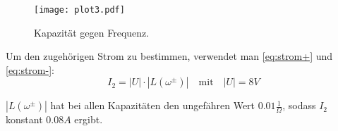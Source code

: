 \begin{figure}
  \centering
  \texttt{[image: plot3.pdf]}
  \caption{Kapazität gegen Frequenz.}
  \label{fig:plot3}
\end{figure}
Um den zugehörigen Strom zu bestimmen, verwendet man \autoref{eq:strom+} und \autoref{eq:strom-}:
\begin{equation}
  I_2 = |U| \cdot |L(\omega^\pm)| \quad\textrm{mit}\quad |U| = 8V
\end{equation}

\(|L(\omega^\pm)|\) hat bei allen Kapazitäten den ungefähren Wert \(0.01\frac{1}{\Omega}\), sodass \(I_2\) konstant \(0.08A\) ergibt.
